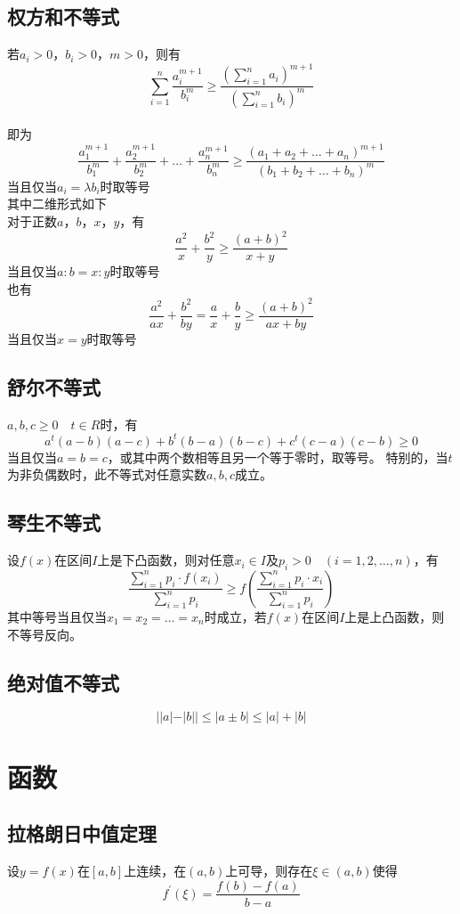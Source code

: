 \documentclass[UTF8]{ctexart}
\begin{document}
		\subsection{权方和不等式}
			若$a_i>0$，$b_i>0$，$m>0$，则有
			\[\sum\limits_{i=1}^{n}\frac{a_i^{m+1}}{b_i^{m}}\geq \frac{\left (\sum\limits_{i=1}^{n}a_i\right) ^{m+1}}{\left (\sum\limits_{i=1}^{n}b_i\right) ^m}\] \\
			即为
			\[\frac{a_1^{m+1}}{b_1^{m}}+\frac{a_2^{m+1}}{b_2^{m}}+\dots+\frac{a_n^{m+1}}{b_n^{m}}\geq \frac{(a_1+a_2+\dots+a_n)^{m+1}}{(b_1+b_2+\dots+b_n)^{m}}\]
			当且仅当$a_i=\lambda b_i$时取等号 \\
			其中二维形式如下\\
			对于正数$a$，$b$，$x$，$y$，有
			\[\frac{a^2}{x}+\frac{b^2}{y}\geq \frac{(a+b)^2}{x+y}\]
			当且仅当$a:b=x:y$时取等号\\
			也有
			\[\frac{a^2}{ax}+\frac{b^2}{by}=\frac{a}{x}+\frac{b}{y}\geq \frac{(a+b)^2}{ax+by}\]
			当且仅当$x=y$时取等号
		\subsection{舒尔不等式}
			$a,b,c\geq 0\quad t\in R$时，有
			\[a^t (a-b)(a-c)+b^t (b-a)(b-c)+c^t (c-a)(c-b)\geq 0\]
			当且仅当$a=b=c$，或其中两个数相等且另一个等于零时，取等号。
			特别的，当$t$为非负偶数时，此不等式对任意实数$a,b,c$成立。
		\subsection{琴生不等式}
			设$f(x)$在区间$I$上是下凸函数，则对任意$x_i\in I$及$p_i>0\quad (i=1,2,\dots,n)$，有
			\[ \frac{\sum\limits_{i=1}^{n}p_i\cdot f(x_i)}{\sum\limits_{i=1}^{n}p_i}\geq f \left (\frac{\sum\limits_{i=1}^{n}p_i\cdot x_i}{\sum\limits_{i=1}^{n}p_i} \right ) \]
			其中等号当且仅当$x_1=x_2=\dots=x_n$时成立，若$f(x)$在区间$I$上是上凸函数，则不等号反向。
		\subsection{绝对值不等式}
			\[||a|-|b|| \leq |a\pm b| \leq |a|+|b|\]
	\section{函数}
		\subsection{拉格朗日中值定理}
			设$y=f(x)$在$[a,b]$上连续，在$(a,b)$上可导，则存在$\xi \in (a,b)$使得
			\[f^{'}(\xi)=\frac{f(b)-f(a)}{b-a}\]
\end{document}
